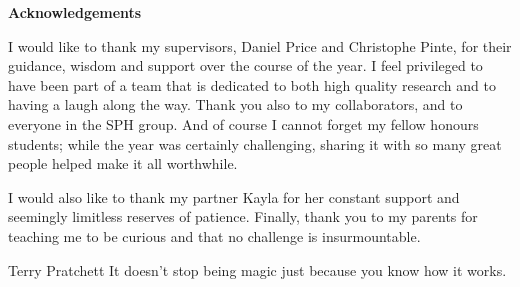 {}

\begin{center}
    
    {\Large \textbf{Acknowledgements}}
    
\end{center}

\noindent I would like to thank my supervisors, Daniel Price and Christophe Pinte, for their guidance, wisdom and support over the course of the year.
I feel privileged to have been part of a team that is dedicated to both high quality research and to having a laugh along the way.
Thank you also to my collaborators, and to everyone in the SPH group.
And of course I cannot forget my fellow honours students; while the year was certainly challenging, sharing it with so many great people helped make it all worthwhile.

I would also like to thank my partner Kayla for her constant support and seemingly limitless reserves of patience.
Finally, thank you to my parents for teaching me to be curious and that no challenge is insurmountable.%

\vfill

\begin{chapquote}{Terry Pratchett}
    It doesn't stop being magic just because you know how it works.
\end{chapquote}

\newpage